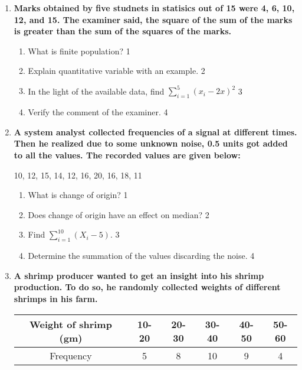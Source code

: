 \documentclass{article}
\begin{document}
  \begin{enumerate}
  
   \item
	  \textbf{Marks obtained by five studnets in statisics out of 15 were 4, 6, 10, 12, and 15. The examiner said, the square of the sum of the marks is greater than the sum of the squares of the marks.} 
  
  \begin{enumerate}
    \item
	What is finite population? \hfill 1
    \item
	Explain quantitative variable with an example. \hfill 2
    \item  
	In the light of the available data, find $\displaystyle \sum_{i=1}^5 (x_i-2x)^2$ \hfill 3
    \item
	Verify the comment of the examiner. \hfill 4
  \end{enumerate}
  
     \item
	  \textbf{A system analyst collected frequencies of a signal at different times. Then he realized due to some unknown noise, 0.5 units got added to all the values. The recorded values are given below:} 
	  
	  \begin{center}
	  10, 12, 15, 14, 12, 16, 20, 16, 18, 11
	  \end{center}
  
  \begin{enumerate}
    \item
	What is change of origin? \hfill 1
    \item
	Does change of origin have an effect on median? \hfill 2
    \item  
	Find $\displaystyle \sum_{i=1}^{10} (X_i-5)$. \hfill 3
    \item
	Determine the summation of the values discarding the noise. \hfill 4
  \end{enumerate}
  
     \item
	  \textbf{A shrimp producer wanted to get an insight into his shrimp production. To do so, he randomly collected weights of different shrimps in his farm.} 
	  

	  \begin{table}[h]
	  \centering
\begin{tabular}{c|c|c|c|c|c}
Weight of shrimp (gm) & 10-20 & 20-30 & 30-40 & 40-50 & 50-60 \\ \hline
Frequency & 5 & 8 & 10 & 9 & 4
\end{tabular}
\end{table}


\end{enumerate}
\end{document}

